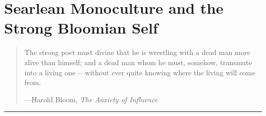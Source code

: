 \chapter{Searlean Monoculture 
and the Strong Bloomian Self}
\label{ch:monoculture-and-strong-self}

\begin{quote}
The strong poet must divine that he is wrestling with a dead man more
alive than himself; and a dead man whom he must, somehow, transmute
into a living one\,---\,without ever quite knowing where the living
will come from.

\hfill ---Harold Bloom, \emph{The Anxiety of Influence}
\end{quote}

\begin{center}\rule{0.5\linewidth}{0.5pt}\end{center}



%

